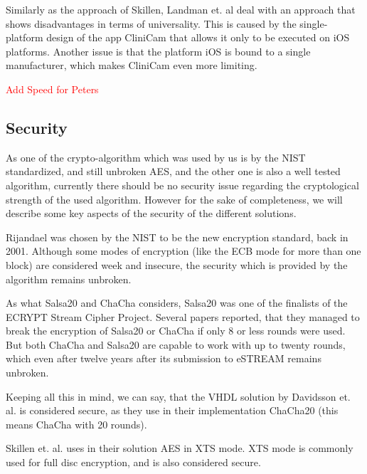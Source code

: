 \documentclass[12pt,a4paper,titlepage,oneside]{scrartcl}
\newcommand\todo[1]{\textcolor{red}{#1}}
\begin{document}
Similarly as the approach of Skillen, Landman et. al \cite{pmid25565678} deal with an approach that shows disadvantages in terms of universality.
This is caused by the single-platform design of the app CliniCam that allows it only to be executed on iOS platforms.
Another issue is that the platform iOS is bound to a single manufacturer, which makes CliniCam even more limiting.

\todo{Add Speed for Peters}

\subsection{Security}
As one of the crypto-algorithm which was used by us is by the NIST standardized, and still unbroken AES, and the other one is also a well tested algorithm, currently there should be no security issue regarding the cryptological strength of the used algorithm.
However for the sake of completeness, we will describe some key aspects of the security of the different solutions.

Rijandael was chosen by the NIST to be the new encryption standard, back in 2001.
Although some modes of encryption (like the ECB mode for more than one block) are considered week and insecure, the security which is provided by the algorithm remains unbroken.

As what Salsa20 and ChaCha considers, Salsa20 was one of the finalists of the ECRYPT Stream Cipher Project. \cite{bernstein2008salsa20}
Several papers reported, that they managed to break the encryption of Salsa20 or ChaCha if only 8 or less rounds were used. \cite{aumasson2008new, crowley2006truncated, fischer2006non, tsunoo2007differential}
But both ChaCha and Salsa20 are capable to work with up to twenty rounds, which even after twelve years after its submission to eSTREAM remains unbroken.

Keeping all this in mind, we can say, that the VHDL solution by Davidsson et. al. is considered secure, as they use in their implementation ChaCha20 (this means ChaCha with 20 rounds). \cite{Davidsson2016}

Skillen et. al. uses in their solution AES in XTS mode.
XTS mode is commonly used for full disc encryption, and is also considered secure. \cite{alomari2014implementation}
\end{document}
